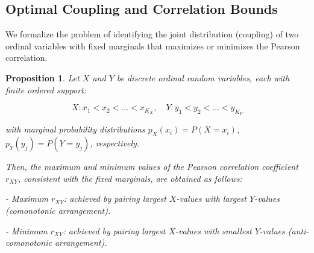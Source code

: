 \documentclass[
  12pt,
]{article}
\theoremstyle{plain}
\newtheorem{proposition}[theorem]{Proposition}
\theoremstyle{definition}
\theoremstyle{remark}
\begin{document}
\subsection{Optimal Coupling and Correlation
Bounds}\label{optimal-coupling-and-correlation-bounds}

We formalize the problem of identifying the joint distribution
(coupling) of two ordinal variables with fixed marginals that maximizes
or minimizes the Pearson correlation.

\label{prop-max-product}
\begin{proposition}

Let $X$ and $Y$ be discrete ordinal random variables, each with finite ordered support:

$$
X: x_1 < x_2 < \dots < x_{K_X},\quad Y: y_1 < y_2 < \dots < y_{K_Y}
$$

with marginal probability distributions $p_X(x_i) = P(X = x_i)$, $p_Y(y_j) = P(Y = y_j)$, respectively.

Then, the maximum and minimum values of the Pearson correlation coefficient $r_{XY}$, consistent with the fixed marginals, are obtained as follows:

- Maximum $r_{XY}$: achieved by pairing largest $X$-values with largest $Y$-values (comonotonic arrangement).
    
- Minimum $r_{XY}$: achieved by pairing largest $X$-values with smallest $Y$-values (anti-comonotonic arrangement).
\end{proposition}
\end{document}
